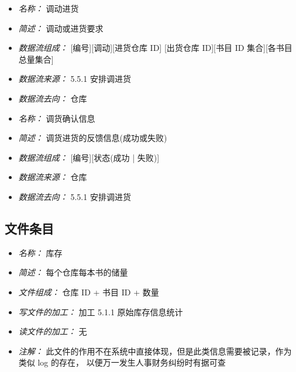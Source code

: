 \vspace{-1mm}


\begin{itemize}
\item \textit{名称： }调动进货
\item \textit{简述： }调动或进货要求
\item \textit{数据流组成： }[编号][调动][进货仓库 ID] [出货仓库 ID][书目 ID 集合][各书目总量集合] 
\item \textit{数据流来源： }5.5.1 安排调进货
\item \textit{数据流去向： }仓库

\end{itemize}


\vspace{-1mm}


\begin{itemize}
\item \textit{名称： }调货确认信息
\item \textit{简述： } 调货进货的反馈信息(成功或失败) 
\item \textit{数据流组成： }[编号][状态(成功 | 失败)] 
\item \textit{数据流来源： }仓库
\item \textit{数据流去向： }5.5.1 安排调进货

\end{itemize}


\vspace{-1mm}

\subsection{文件条目}
\begin{itemize}
\item \textit{名称： }库存
\item \textit{简述： }每个仓库每本书的储量
\item \textit{文件组成： }仓库 ID + 书目 ID + 数量
\item \textit{写文件的加工： }加工 5.1.1 原始库存信息统计
\item \textit{读文件的加工： }无 
\item \textit{注解： }此文件的作用不在系统中直接体现，但是此类信息需要被记录，作为类似 log 的存在， 以便万一发生人事财务纠纷时有据可查

\end{itemize}


\vspace{-1mm}


